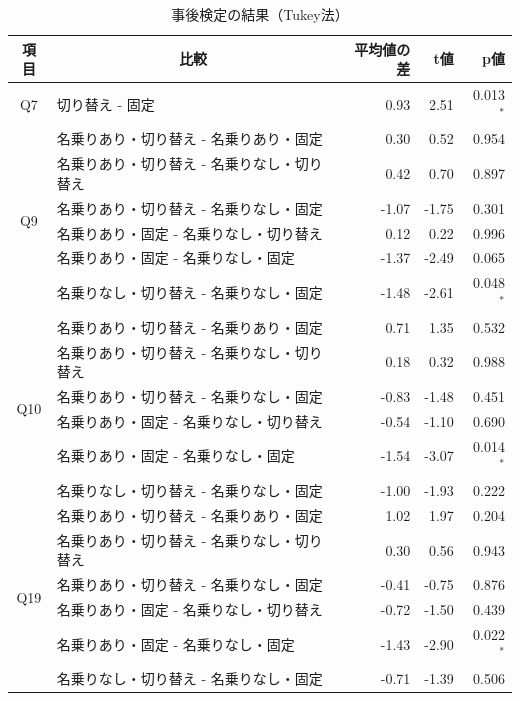 \documentclass[10pt,twocolumn]{jsarticle}
\begin{document}
\begin{table}[htbp]
    \centering
    \caption{事後検定の結果（Tukey法）}
    \label{tab:multiple_comparison}
    \renewcommand{\arraystretch}{1.2}
    \footnotesize
    
    \begin{tabular*}{\textwidth}{@{\extracolsep{\fill}}clrrr}
        \hline
        項目 & \multicolumn{1}{c}{比較} & 平均値の差  & t値 & p値 \\
        \hline

        \multirow{1}{*}{Q7} & 切り替え - 固定 & 0.93 & 2.51 & 0.013$^{*}$ \\
        \hline

        
        \multirow{6}{*}{Q9} & 名乗りあり・切り替え - 名乗りあり・固定 & 0.30 & 0.52 & 0.954 \\
         & 名乗りあり・切り替え - 名乗りなし・切り替え & 0.42 & 0.70 & 0.897 \\
         & 名乗りあり・切り替え - 名乗りなし・固定 & -1.07 & -1.75 & 0.301 \\
         & 名乗りあり・固定 - 名乗りなし・切り替え & 0.12 & 0.22 & 0.996 \\
         & 名乗りあり・固定 - 名乗りなし・固定 & -1.37 & -2.49 & 0.065 \\
         & 名乗りなし・切り替え - 名乗りなし・固定 & -1.48 & -2.61 & 0.048$^{*}$ \\
        \hline
        
        \multirow{6}{*}{Q10} & 名乗りあり・切り替え - 名乗りあり・固定 & 0.71 & 1.35 & 0.532 \\
         & 名乗りあり・切り替え - 名乗りなし・切り替え & 0.18 & 0.32 & 0.988 \\
         & 名乗りあり・切り替え - 名乗りなし・固定 & -0.83 & -1.48 & 0.451 \\
         & 名乗りあり・固定 - 名乗りなし・切り替え & -0.54 & -1.10 & 0.690 \\
         & 名乗りあり・固定 - 名乗りなし・固定 & -1.54 & -3.07 & 0.014$^{*}$ \\
         & 名乗りなし・切り替え - 名乗りなし・固定 & -1.00 & -1.93 & 0.222 \\
        \hline
        
        \multirow{6}{*}{Q19} & 名乗りあり・切り替え - 名乗りあり・固定 & 1.02 & 1.97 & 0.204 \\
         & 名乗りあり・切り替え - 名乗りなし・切り替え & 0.30 & 0.56 & 0.943 \\
         & 名乗りあり・切り替え - 名乗りなし・固定 & -0.41 & -0.75 & 0.876 \\
         & 名乗りあり・固定 - 名乗りなし・切り替え & -0.72 & -1.50 & 0.439 \\
         & 名乗りあり・固定 - 名乗りなし・固定 & -1.43 & -2.90 & 0.022$^{*}$ \\
         & 名乗りなし・切り替え - 名乗りなし・固定 & -0.71 & -1.39 & 0.506 \\
        
        \hline
    \end{tabular*}
\end{table}
\end{document}
